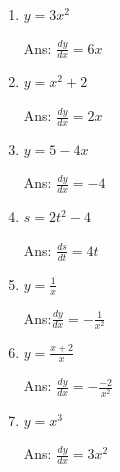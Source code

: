 \begin{enumerate}

\item
$y 	= 3x^2$ %

Ans: $\frac{dy}{dx} 	= 6x$

\item
$y 	= x^2 + 2$ %

Ans: $\frac{dy}{dx} 	= 2x$

\item
$y 	= 5 - 4x$ %

Ans: $\frac{dy}{dx} 	= - 4$

\item
$s 	= 2t^2 - 4$ %

Ans:	$\frac{ds}{dt} 	= 4t$

\item
$y 	= \frac{1}{x}$ %

Ans:$\frac{dy}{dx} 	= -\frac{1}{x^2}$

\item
$ y 	= \frac{x + 2}{x}$ %

Ans: $\frac{dy}{dx} 	= -\frac{-2}{x^2}$

\item
$y 	= x^3$ %

Ans: $\frac{dy}{dx} 	= 3x^2$


\end{enumerate}
